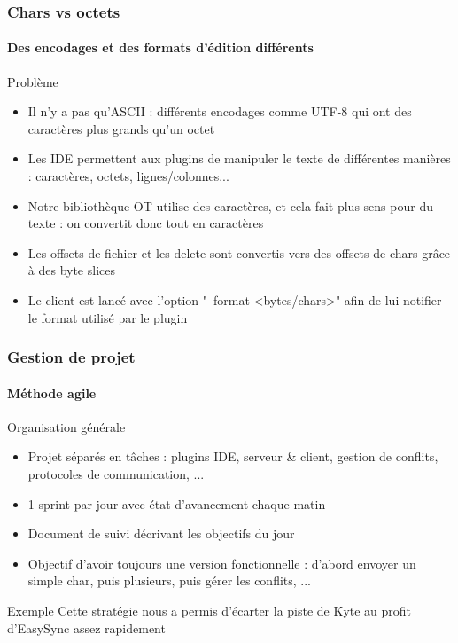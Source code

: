 \documentclass{beamer}
\begin{document}
\begin{frame}
    \frametitle{Chars vs octets}
    \framesubtitle{Des encodages et des formats d'édition différents}
    \begin{block}{Problème}
        \begin{itemize}
            \item Il n'y a pas qu'ASCII : différents encodages comme UTF-8 qui ont des caractères plus grands qu'un octet
            \item Les IDE permettent aux plugins de manipuler le texte de différentes manières : caractères, octets, lignes/colonnes...
            \item Notre bibliothèque OT utilise des caractères, et cela fait plus sens pour du texte : on convertit donc tout en caractères
            \item Les offsets de fichier et les delete sont convertis vers des offsets de chars grâce à des byte slices
            \item Le client est lancé avec l'option "--format <bytes/chars>" afin de lui notifier le format utilisé par le plugin
        \end{itemize}
    \end{block}
\end{frame}

\begin{frame}
    \frametitle{Gestion de projet}
    \framesubtitle{Méthode agile}
    \begin{block}{Organisation générale}
        \begin{itemize}
            \item Projet séparés en tâches : plugins IDE, serveur \& client, gestion de conflits, protocoles de communication, ...
            \item 1 sprint par jour avec état d'avancement chaque matin
            \item Document de suivi décrivant les objectifs du jour
            \item Objectif d'avoir toujours une version fonctionnelle : d'abord envoyer un simple char, puis plusieurs, puis gérer les conflits, ...
        \end{itemize}
    \end{block}
    \pause
    \begin{exampleblock}{Exemple}
        Cette stratégie nous a permis d'écarter la piste de Kyte au profit d'EasySync assez rapidement
    \end{exampleblock}
\end{frame}
\end{document}
